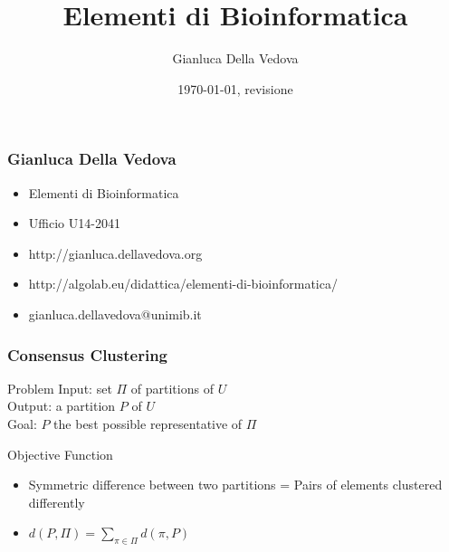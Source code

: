 \usepackage[italian]{babel}
\usepackage[utf8]{inputenc}
\usepackage{pgf}
\usepackage{verbatim}

\usepackage[T1]{fontenc}

\immediate{}


\author{Gianluca Della Vedova}
\title{Elementi di Bioinformatica}
\date{\today, {\tiny revisione \VCRevision}}







\begin{frame}
  \titlepage
\end{frame}


\begin{frame}\frametitle{Gianluca Della Vedova}
  \begin{itemize}
  \item
    Elementi di Bioinformatica
  \item
    Ufficio U14-2041
  \item
    \textsf{\small http://gianluca.dellavedova.org}
  \item
      \textsf{\small
      http://algolab.eu/didattica/elementi-di-bioinformatica/}
  \item
    \textsf{\small gianluca.dellavedova@unimib.it}
  \end{itemize}
\end{frame}

 \begin{frame}
   \frametitle{Consensus Clustering}
   \begin{block}{Problem}
     \alert{Input}: set $\Pi$ of partitions of $U$\\
     \alert{Output}: a partition $P$ of $U$\\
     \alert{Goal}: $P$ the best possible representative of $\Pi$
   \end{block}

   \begin{block}{Objective Function}
     \begin{itemize}
     \item
       Symmetric difference between two partitions =
       Pairs of elements clustered differently
     \item
       $d(P,\Pi)=\sum_{\pi\in \Pi}d(\pi,P)$
     \end{itemize}
   \end{block}
 \end{frame}



